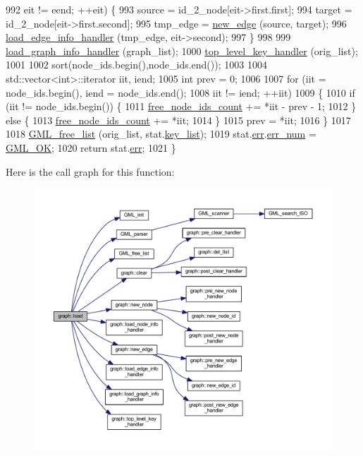 \begin{DoxyCode}
992      eit != eend; ++eit) \{
993     source = id\_2\_node[eit->first.first];
994     target = id\_2\_node[eit->first.second];
995     tmp\_edge = \mbox{\hyperlink{classgraph_a02a0c3a219f75d68caa408ef339d4a1c}{new\_edge}} (source, target);
996     \mbox{\hyperlink{classgraph_ad049a2f8c191a7dc359e684ef56304d1}{load\_edge\_info\_handler}} (tmp\_edge, eit->second);
997     \}
998 
999     \mbox{\hyperlink{classgraph_aaca9ede8005388fd22b56e12280bf1bf}{load\_graph\_info\_handler}} (graph\_list);
1000     \mbox{\hyperlink{classgraph_a33bc9b45f0d4738c491535147b703cc5}{top\_level\_key\_handler}} (orig\_list);
1001 
1002     sort(node\_ids.begin(),node\_ids.end());
1003 
1004     std::vector<int>::iterator iit, iend;
1005     \textcolor{keywordtype}{int} prev = 0;
1006 
1007     \textcolor{keywordflow}{for} (iit = node\_ids.begin(), iend = node\_ids.end();
1008      iit != iend; ++iit)
1009     \{
1010     \textcolor{keywordflow}{if} (iit != node\_ids.begin()) \{
1011         \mbox{\hyperlink{classgraph_a9480e2310fe64c3a8ad295bb3f119772}{free\_node\_ids\_count}} += *iit - prev - 1;  
1012     \} \textcolor{keywordflow}{else} \{
1013         \mbox{\hyperlink{classgraph_a9480e2310fe64c3a8ad295bb3f119772}{free\_node\_ids\_count}} += *iit;
1014     \}
1015     prev = *iit;
1016     \}
1017 
1018     \mbox{\hyperlink{gml__parser_8h_ac8ee95de418abf6947ec597d235f0db2}{GML\_free\_list}} (orig\_list, stat.\mbox{\hyperlink{struct_g_m_l__stat_a3c6317b5ad431531fea5a16bc64490dd}{key\_list}});
1019     stat.\mbox{\hyperlink{struct_g_m_l__stat_afa0e8f9827fda2e60f3a5c7965a464b2}{err}}.\mbox{\hyperlink{struct_g_m_l__error_a66fe2c5a3d2d40e77ff486007dfe7f76}{err\_num}} = \mbox{\hyperlink{gml__scanner_8h_aabc90afcb30e75bca3bd9969ce74790ca724a94ac9d394a24aa1f80fb602ecaf2}{GML\_OK}};
1020     \textcolor{keywordflow}{return} stat.\mbox{\hyperlink{struct_g_m_l__stat_afa0e8f9827fda2e60f3a5c7965a464b2}{err}};
1021 \}
\end{DoxyCode}
Here is the call graph for this function\+:
\nopagebreak
\begin{figure}[H]
\begin{center}
\leavevmode
\includegraphics[width=350pt]{classgraph_a37c17685e1becc66723699d4c9db072b_cgraph}
\end{center}
\end{figure}
